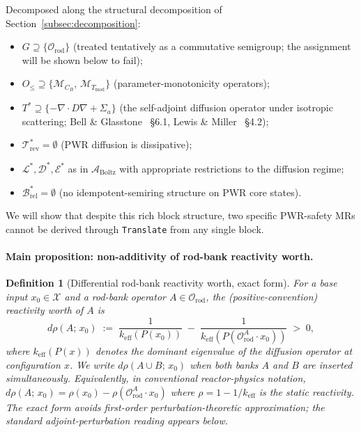 \documentclass[manuscript]{acmart}
\newtheorem{definition}{Definition}
\begin{document}
Decomposed along the structural decomposition of Section~\ref{subsec:decomposition}:
\begin{itemize}[nosep,leftmargin=*]
  \item $G \supseteq \{\mathcal{O}_{\mathrm{rod}}\}$ (treated tentatively as a commutative semigroup; the assignment will be shown below to fail);
  \item $O_{\le} \supseteq \{\mathcal{M}_{C_{B}},\,\mathcal{M}_{T_{\mathrm{mod}}}\}$ (parameter-monotonicity operators);
  \item $T^{*} \supseteq \{-\nabla \cdot D \nabla + \Sigma_{a}\}$ (the self-adjoint diffusion operator under isotropic scattering; Bell \& Glasstone~\cite{BellGlasstone1970} \S6.1, Lewis \& Miller~\cite{LewisMiller1993} \S4.2);
  \item $\mathcal{T}^{*}_{\mathrm{rev}} = \emptyset$ (PWR diffusion is dissipative);
  \item $\mathcal{L}^{*}, \mathcal{D}^{*}, \mathcal{E}^{*}$ as in $\mathcal{A}_{\mathrm{Boltz}}$ with appropriate restrictions to the diffusion regime;
  \item $\mathcal{B}_{\mathrm{rel}}^{*} = \emptyset$ (no idempotent-semiring structure on PWR core states).
\end{itemize}

We will show that despite this rich block structure, two specific PWR-safety MRs cannot be derived through \texttt{Translate} from any single block.

\paragraph{Main proposition: non-additivity of rod-bank reactivity worth.}
\label{subsubsec:nonadd}

\begin{definition}[Differential rod-bank reactivity worth, exact form]
\label{def:drho-exact}
For a base input $x_{0} \in \mathcal{X}$ and a rod-bank operator $A \in \mathcal{O}_{\mathrm{rod}}$, the (positive-convention) reactivity worth of $A$ is
\[
d\rho(A;\,x_{0}) \;:=\; \frac{1}{k_{\mathrm{eff}}(P(x_{0}))} \;-\; \frac{1}{k_{\mathrm{eff}}(P(\mathcal{O}_{\mathrm{rod}}^{A} \cdot x_{0}))} \;>\; 0,
\]
where $k_{\mathrm{eff}}(P(x))$ denotes the dominant eigenvalue of the diffusion operator at configuration $x$. We write $d\rho(A \cup B;\,x_{0})$ when both banks $A$ and $B$ are inserted simultaneously. Equivalently, in conventional reactor-physics notation, $d\rho(A;\,x_{0}) = \rho(x_{0}) - \rho(\mathcal{O}_{\mathrm{rod}}^{A} \cdot x_{0})$ where $\rho = 1 - 1/k_{\mathrm{eff}}$ is the static reactivity. The exact form avoids first-order perturbation-theoretic approximation; the standard adjoint-perturbation reading appears below.
\end{definition}
\end{document}
